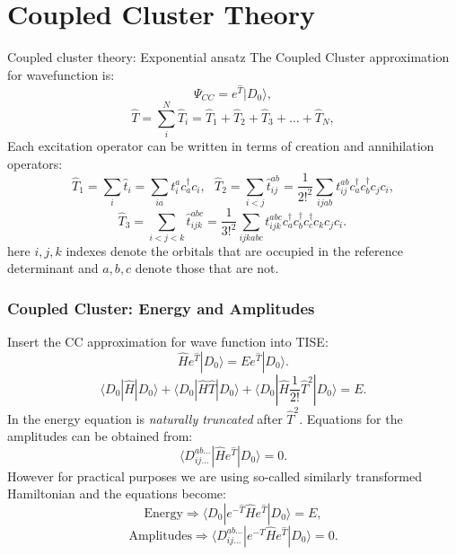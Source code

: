 \documentclass{beamer}
\begin{document}
\section{Coupled Cluster Theory}

  \begin{frame}{Coupled cluster theory: Exponential ansatz}
  The Coupled Cluster approximation for wavefunction is:
	\begin{equation*}
	\Psi_{CC} =  e^{\hat{T}}|D_0\rangle,
	\end{equation*}
	\begin{equation*}
	\hat{T} = \sum_i^{N} \hat{T}_i  = \hat{T}_1 + \hat{T}_2 +\hat{T}_3 + \dots + \hat{T}_N,
	\end{equation*}
	Each excitation operator can be written in terms of creation and annihilation operators:
	\[ 
	\hat{T}_1 = \sum_{i}\hat{t}_i = \sum_{ia}t_{i}^{a} c^\dag_{a}  c_{i}, \text{    } 
	\hat{T}_2 = \sum_{i<j}\hat{t}_{ij}^{ab} = \frac{1}{2!^2}\sum_{ijab}t_{ij}^{ab} c^\dag_{a} c^\dag_{b} c_{j} c_{i}, 
	\]
	\[ 
	\hat{T}_3 = \sum_{i<j<k}\hat{t}_{ijk}^{abc} = \frac{1}{3!^2}\sum_{ijkabc}t_{ijk}^{abc} c^\dag_{a} c^\dag_{b} c^\dag_{c} c_{k}c_{j} c_{i}.
	\,
	\]
	here $i,j,k$ indexes denote the orbitals that are occupied in the reference determinant and $a,b,c$ denote those that are not.
\end{frame}


\begin{frame}
\frametitle{Coupled Cluster: Energy and Amplitudes}
Insert the CC approximation for wave function into TISE:
\begin{equation*}
\hat{H}e^{\hat{T}}|D_0\rangle =Ee^{\hat{T}}|D_0\rangle.
\end{equation*}
\begin{equation*}
\langle D_0|\hat{H}|D_0\rangle +  \langle D_0|\hat{H}\hat{T}|D_0\rangle +\langle D_0|\hat{H}\frac{1}{2!}\hat{T}^2|D_0\rangle  = E.
\end{equation*}
In the energy equation is \textit{naturally truncated} after $\hat{T}^2$.
Equations for the amplitudes can be obtained from:
\begin{equation*}
 \langle D_{ij\dots}^{ab\dots}|\hat{H}e^{\hat{T}}|D_0 \rangle = 0.
\end{equation*}
However for practical purposes we are using so-called similarly transformed Hamiltonian and the equations become:
\begin{equation*}
\text{Energy} \Longrightarrow \langle D_0|e^{-\hat{T}}\hat{H}e^{\hat{T}}|D_0\rangle = E,
\end{equation*}
\begin{equation*}
\text{Amplitudes} \Longrightarrow \langle D_{ij\dots}^{ab\dots}|e^{-\hat{T}}\hat{H}e^{\hat{T}}|D_0 \rangle = 0.
\end{equation*}

\end{frame}
\end{document}
